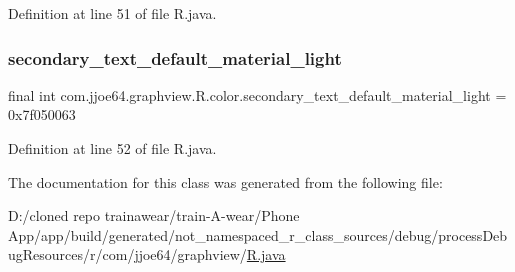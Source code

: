Definition at line 51 of file R.\+java.

\mbox{\label{classcom_1_1jjoe64_1_1graphview_1_1_r_1_1color_ac5da7af8d455e93b3263c1f7c0f1cf66}} 
\subsubsection{\texorpdfstring{secondary\_text\_default\_material\_light}{secondary\_text\_default\_material\_light}}
{\footnotesize\ttfamily final int com.\+jjoe64.\+graphview.\+R.\+color.\+secondary\+\_\+text\+\_\+default\+\_\+material\+\_\+light = 0x7f050063\hspace{0.3cm}{\ttfamily [static]}}



Definition at line 52 of file R.\+java.



The documentation for this class was generated from the following file\+:\begin{DoxyCompactItemize}
\item 
D\+:/cloned repo trainawear/train-\/\+A-\/wear/\+Phone App/app/build/generated/not\+\_\+namespaced\+\_\+r\+\_\+class\+\_\+sources/debug/process\+Debug\+Resources/r/com/jjoe64/graphview/\mbox{\hyperlink{process_debug_resources_2r_2com_2jjoe64_2graphview_2_r_8java}{R.\+java}}\end{DoxyCompactItemize}
